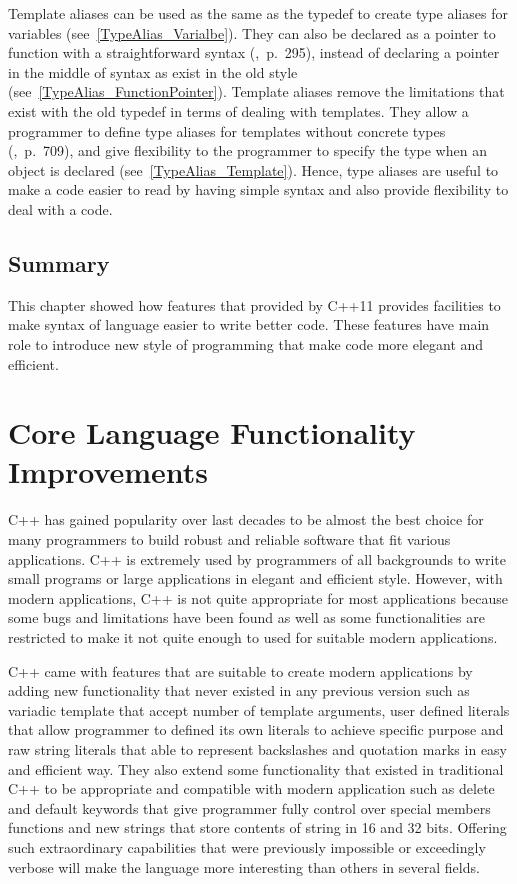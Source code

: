 \documentclass[11pt]{report}
\begin{document}
Template aliases can be used as the same as the typedef to create type aliases for variables (see~\ref{TypeAlias_Varialbe}). They can also be declared as a pointer to function with a straightforward syntax (\cite{Gregorie:professionalcpp},~p.~295), instead of declaring a pointer in the middle of syntax as exist in the old style (see~\ref{TypeAlias_FunctionPointer}). Template aliases remove the limitations that exist with the old typedef in terms of dealing with templates. They allow a programmer to define type aliases for templates without concrete types (\cite{Gregorie:professionalcpp},~p.~709), and give flexibility to the programmer to specify the type when an object is declared (see~\ref{TypeAlias_Template}). Hence, type aliases are useful to make a code easier to read by having simple syntax and also provide flexibility to deal with a code.

\section{Summary}
\label{sect: Summary}
This chapter showed how features that provided by C++11 provides facilities to make syntax of language easier to write better code.  These features have main role to introduce new style of programming that make code more elegant and efficient.

\chapter{Core Language Functionality Improvements}
\label{chapter: Functionality Improvements}
C++ has gained popularity over last decades to be almost the best choice for many programmers to build robust and reliable software that fit various applications. C++ is extremely used by programmers of all backgrounds to write small programs or large applications in elegant and efficient style. However, with modern applications, C++ is not quite appropriate for most applications because some bugs and limitations have been found as well as some functionalities are restricted to make it not quite enough to used for suitable modern applications.

C++ came with features that are suitable to create modern applications by adding new functionality that never existed in any previous version such as variadic template that accept number of template arguments, user defined literals that allow programmer to defined its own literals to achieve specific purpose and raw string literals that able to represent backslashes and quotation marks in easy and efficient way. They also extend some functionality that existed in traditional C++ to be appropriate and compatible with modern application such as delete and default keywords that give programmer fully control over special members functions and new strings that store contents of string in 16 and 32 bits. Offering such extraordinary capabilities that were previously impossible or exceedingly verbose will make the language more interesting than others in several fields.
\end{document}
